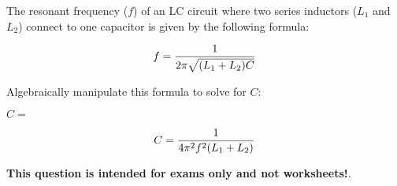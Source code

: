 

The resonant frequency ($f$) of an LC circuit where two series inductors ($L_1$ and $L_2$) connect to one capacitor is given by the following formula:

$$f = {1 \over {2 \pi \sqrt{(L_1 + L_2) C}}}$$

Algebraically manipulate this formula to solve for $C$:

\vskip 20pt

$C = $







$$C = {1 \over {4 \pi^2 f^2 (L_1 + L_2)}}$$







{\bf This question is intended for exams only and not worksheets!}.



